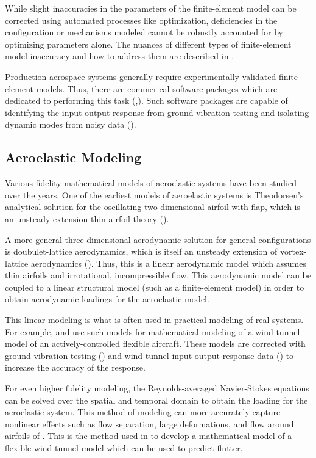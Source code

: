 While slight inaccuracies in the parameters of the finite-element model can be corrected using automated processes like optimization, deficiencies in the configuration or mechanisms modeled cannot be robustly accounted for by optimizing parameters alone. The nuances of different types of finite-element model inaccuracy and how to address them are described in \cite{Chen2001}.

Production aerospace systems generally require experimentally-validated finite-element models. Thus, there are commerical software packages which are dedicated to performing this task (\cite{LMSTestLab2004},\cite{STARsite}). Such software packages are capable of identifying the input-output response from ground vibration testing and isolating dynamic modes from noisy data (\cite{Peeters2004}).

\subsection{Aeroelastic Modeling} %

Various fidelity mathematical models of aeroelastic systems have been studied over the years. One of the earliest models of aeroelastic systems is Theodorsen's analytical solution for the oscillating two-dimensional airfoil with flap, which is an unsteady extension thin airfoil theory (\cite{Theodorsen1949}).

A more general three-dimensional aerodynamic solution for general configurations is doubulet-lattice aerodynamics, which is itself an unsteady extension of vortex-lattice aerodynamics (\cite{Albano1969}). Thus, this is a linear aerodynamic model which assumes thin airfoils and irrotational, incompressible flow. This aerodynamic model can be coupled to a linear structural model (such as a finite-element model) in order to obtain aerodynamic loadings for the aeroelastic model.

This linear modeling is what is often used in practical modeling of real systems. For example, \cite{Vartio2005} and \cite{Penning2009} use such models for mathematical modeling of a wind tunnel model of an actively-controlled flexible aircraft. These models are corrected with ground vibration testing (\cite{Bartley-Cho2008}) and wind tunnel input-output response data (\cite{Vartio2008}) to increase the accuracy of the response.

For even higher fidelity modeling, the Reynolds-averaged Navier-Stokes equations can be solved over the spatial and temporal domain to obtain the loading for the aeroelastic system. This method of modeling can  more accurately capture nonlinear effects such as flow separation, large deformations, and flow around airfoils of . This is the method used in \cite{Argaman2019} to develop a mathematical model of a flexible wind tunnel model which can be used to predict flutter.

